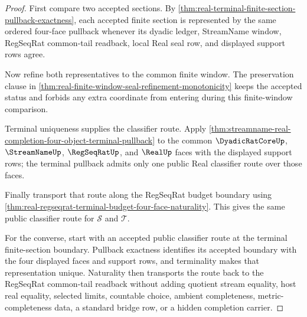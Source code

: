 \begin{proof}
First compare two accepted sections. By
\autoref{thm:real-terminal-finite-section-pullback-exactness}, each accepted
finite section is represented by the same ordered four-face pullback whenever
its dyadic ledger, StreamName window, RegSeqRat common-tail readback, local Real
seal row, and displayed support rows agree.

Now refine both representatives to the common finite window. The preservation
clause in \autoref{thm:real-finite-window-seal-refinement-monotonicity} keeps
the accepted status and forbids any extra coordinate from entering during this
finite-window comparison.

Terminal uniqueness supplies the classifier route. Apply
\autoref{thm:streamname-real-completion-four-object-terminal-pullback} to the
common $\DyadicRatCoreUp$, $\StreamNameUp$, $\RegSeqRatUp$, and $\RealUp$ faces
with the displayed support rows; the terminal pullback admits only one public
Real classifier route over those faces.

Finally transport that route along the RegSeqRat budget boundary using
\autoref{thm:real-regseqrat-terminal-budget-four-face-naturality}. This gives
the same public classifier route for $\mathcal S$ and $\mathcal T$.

For the converse, start with an accepted public classifier route at the
terminal finite-section boundary. Pullback exactness identifies its accepted
boundary with the four displayed faces and support rows, and terminality makes
that representation unique. Naturality then transports the route back to the
RegSeqRat common-tail readback without adding quotient stream equality, host
real equality, selected limits, countable choice, ambient completeness,
metric-completeness data, a standard bridge row, or a hidden completion carrier.
\end{proof}

